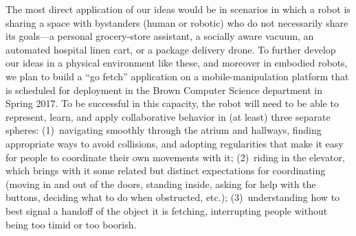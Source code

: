 
The most direct application of our ideas would be in scenarios in
which a robot is sharing a space with bystanders (human or robotic)
who do not necessarily share its goals---a personal grocery-store
assistant, a socially aware vacuum, an automated hospital linen cart, or
a package delivery drone.  To further develop our ideas in a physical
environment like these, and moreover in embodied robots,
we plan to build a ``go fetch'' application on a mobile-manipulation
platform that is scheduled for deployment in the Brown Computer
Science department in Spring 2017.  To be successful in this capacity,
the robot will need to be able to represent, learn, and apply
collaborative behavior in (at least) three separate spheres:
%
(1)~navigating smoothly through the atrium and hallways, finding
  appropriate ways to avoid collisions, and adopting regularities that
  make it easy for people to coordinate their own movements with it;
%
(2)~riding in the elevator, which brings with it some related but
  distinct expectations for coordinating (moving in and out of the
  doors, standing inside, asking for help with the buttons, deciding
  what to do when obstructed, etc.);
%
(3)~understanding how to best signal a handoff of the object it is
  fetching, interrupting people without being too timid or too
  boorish.
%

% 
% 



